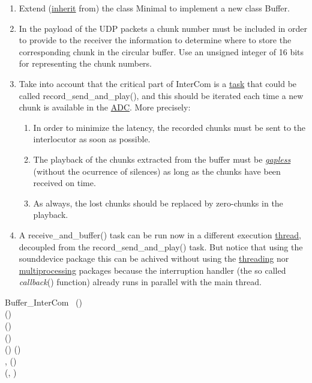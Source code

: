 \begin{enumerate}
\item Extend
  (\href{https://en.wikipedia.org/wiki/Inheritance_(object-oriented_programming)}{inherit}
  from) the class Minimal to implement a new class
  Buffer.
\item In the payload of the UDP packets a chunk number must be
  included in order to provide to the receiver the information to
  determine where to store the corresponding chunk in the circular
  buffer. Use an unsigned integer of 16 bits for representing the
  chunk numbers.
\item Take into account that the critical part of InterCom is a
  \href{https://en.wikipedia.org/wiki/Task_(computing)}{task} that
  could be called record\_send\_and\_play(), and this should be
  iterated each time a new chunk is available in the
  \href{https://en.wikipedia.org/wiki/Analog-to-digital_converter}{ADC}. More
  precisely:
  \begin{enumerate}
  \item In order to minimize the latency, the recorded chunks must be
    sent to the interlocutor as soon as possible.
  \item The playback of the chunks extracted from the buffer must be
    \href{https://en.wikipedia.org/wiki/Gapless_playback}{\emph{gapless}}
    (without the ocurrence of silences) as long as the chunks have
    been received on time.
  \item As always, the lost chunks should be replaced by zero-chunks
    in the playback.
  \end{enumerate}
\item A receive\_and\_buffer() task can be run now in a different
  execution
  \href{https://en.wikipedia.org/wiki/Thread_(computing)}{thread},
  decoupled from the record\_send\_and\_play() task. But notice that
  using the sounddevice package this can be achived without using the
  \href{https://docs.python.org/3/library/threading.html}{threading}
  nor
  \href{https://docs.python.org/3/library/multiprocessing.html}{multiprocessing}
   packages because the interruption handler (the so called
  \emph{callback}() function) already runs in parallel with the main
  thread.
\end{enumerate}

\begin{pseudocode}{Buffer\_InterCom}{~}
  \BEGIN
     \GETS {}()\\
     \GETS {}()\\
    ()\\
     \GETS {}()\\
    ()
  \END
  \ENDPROCEDURE
  \BEGIN
     \GETS {}()\\
    ,  \GETS {}()\\
    (, )
  \END
  \ENDPROCEDURE
\end{pseudocode}

